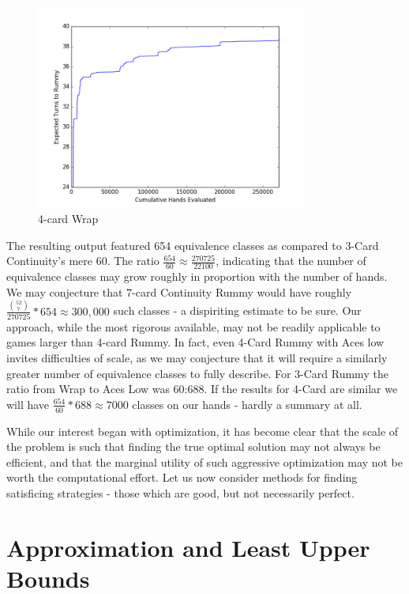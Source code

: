 \documentclass[letter,12pt]{article}
\begin{document}
\begin{figure}
\centering
\includegraphics[width=0.8\textwidth]{fig3.png}
\caption{4-card Wrap}\label{fig:3}
\end{figure}

The resulting output featured 654 equivalence classes as compared to 3-Card Continuity's mere 60. The ratio $\frac{654}{60} \approx \frac{270725}{22100}$, indicating that the number of equivalence classes may grow roughly in proportion with the number of hands. We may conjecture that 7-card Continuity Rummy would have roughly $\frac{\binom{52}{7}}{270725} * 654 \approx 300,000$ such classes - a dispiriting estimate to be sure. Our approach, while the most rigorous available, may not be readily applicable to games larger than 4-card Rummy. In fact, even 4-Card Rummy with Aces low invites difficulties of scale, as we may conjecture that it will require a similarly greater number of equivalence classes to fully describe. For 3-Card Rummy the ratio from Wrap to Aces Low was 60:688. If the results for 4-Card are similar we will have $\frac{654}{60} * 688 \approx 7000$ classes on our hands - hardly a summary at all.

While our interest began with optimization, it has become clear that the scale of the problem is such that finding the true optimal solution may not always be efficient, and that the marginal utility of such aggressive optimization may not be worth the computational effort. Let us now consider methods for finding satisficing strategies - those which are good, but not necessarily perfect.

\section{Approximation and Least Upper Bounds}
\end{document}
